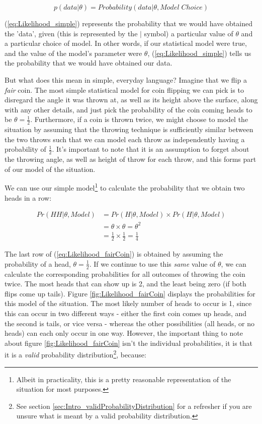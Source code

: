 \documentclass[11pt,fullpage]{book}
\begin{document}
\begin{equation}
p(data|\theta) = Probability(data|\theta,Model \; Choice)
\end{equation}\label{eq:Likelihood_simple}

(\ref{eq:Likelihood_simple}) represents the probability that we would have obtained the 'data', given (this is represented by the $|$ symbol) a particular value of $\theta$ and a particular choice of model. In other words, if our statistical model were true, and the value of the model's parameter were $\theta$, (\ref{eq:Likelihood_simple}) tells us the probability that we would have obtained our data. 

But what does this mean in simple, everyday language? Imagine that we flip a \textit{fair} coin. The most simple statistical model for coin flipping we can pick is to disregard the angle it was thrown at, as well as its height above the surface, along with any other details, and just pick the probability of the coin coming heads to be $\theta=\frac{1}{2}$. Furthermore, if a coin is thrown twice, we might choose to model the situation by assuming that the throwing technique is sufficiently similar between the two throws such that we can model each throw as independently having a probability of $\frac{1}{2}$. It's important to note that it is an assumption to forget about the throwing angle, as well as height of throw for each throw, and this forms part of our model of the situation. 

We can use our simple model\footnote{Albeit in practicality, this is a pretty reasonable representation of the situation for most purposes.} to calculate the probability that we obtain two heads in a row:

\begin{equation}
\begin{align}
Pr(HH|\theta,Model) &= Pr(H|\theta,Model)\times Pr(H|\theta,Model)\\
&= \theta \times \theta = \theta^2\\ 
&= \frac{1}{2}\times \frac{1}{2} = \frac{1}{4}
\end{align}
\end{equation}\label{eq:Likelihood_fairCoin}

The last row of (\ref{eq:Likelihood_fairCoin}) is obtained by assuming the probability of a head, $\theta=\frac{1}{2}$. If we continue to use this \textit{same} value of $\theta$, we can calculate the corresponding probabilities for all outcomes of throwing the coin twice. The most heads that can show up is 2, and the least being zero (if both flips come up tails). Figure \ref{fig:Likelihood_fairCoin} displays the probabilities for this model of the situation. The most likely number of heads to occur is 1, since this can occur in two different ways - either the first coin comes up heads, and the second is tails, or vice versa - whereas the other possibilities (all heads, or no heads) can each only occur in one way. However, the important thing to note about figure \ref{fig:Likelihood_fairCoin} isn't the individual probabilities, it is that it is a \textit{valid} probability distribution\footnote{See section \ref{sec:Intro_validProbabilityDistribution} for a refresher if you are unsure what is meant by a valid probability distribution.}, because:
\end{document}
